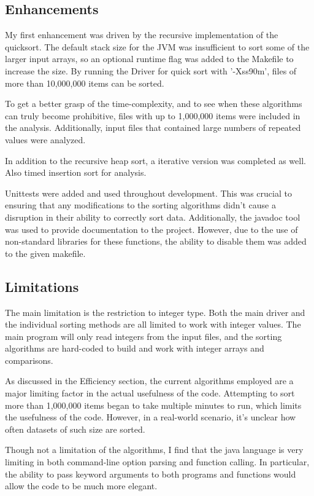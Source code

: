 \documentclass[a4paper,12pt]{article}
\begin{document}
\subsection{Enhancements}
My first enhancement was driven by the recursive implementation of the quicksort.  The default stack size for the JVM was insufficient  to sort some of the larger input arrays, so an optional runtime flag was added to the Makefile to increase the size.  By running the Driver for quick sort with '-Xss90m', files of more than 10,000,000 items can be sorted.  

To get a better grasp of the time-complexity, and to see when these algorithms can truly become prohibitive, files with up to 1,000,000 items were included in the analysis.  Additionally, input files that contained large numbers of repeated values were analyzed.

In addition to the recursive heap sort, a iterative version was completed as well.  Also timed insertion sort for analysis.

Unittests were added and used throughout development.  This was crucial to ensuring that any modifications to the sorting algorithms didn't cause a disruption in their ability to correctly sort data.  Additionally, the javadoc tool was used to provide documentation to the project.  However, due to the use of non-standard libraries for these functions, the ability to disable them was added to the given makefile.


\subsection{Limitations}
The main limitation is the restriction to integer type.  Both the main driver and the individual sorting methods are all limited to work with integer values.  The main program will only read integers from the input files, and the sorting algorithms are hard-coded to build and work with integer arrays and comparisons.  

As discussed in the Efficiency section, the current algorithms employed are a major limiting factor in the actual usefulness of the code.  Attempting to sort more than 1,000,000 items began to take multiple minutes to run, which limits the usefulness of the code.  However, in a real-world scenario, it's unclear how often datasets of such size are sorted.  

Though not a limitation of the algorithms, I find that the java language is very limiting in both command-line option parsing and function calling.  In particular, the ability to pass keyword arguments to both programs and functions would allow the code to be much more elegant.
\end{document}
